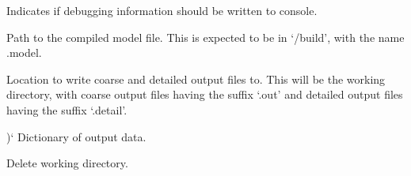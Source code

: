 \documentclass[letterpaper,10pt,english]{sphinxmanual}
\begin{document}
\begin{fulllineitems}
\begin{fulllineitems}
\label{\detokenize{bcmdModel:bayescmd.bcmdModel.bcmd_model.ModelBCMD.debug}}
 \textendash{} Indicates if debugging information should be written to console.

\end{fulllineitems}


\begin{fulllineitems}
\label{\detokenize{bcmdModel:bayescmd.bcmdModel.bcmd_model.ModelBCMD.program}}
 \textendash{} Path to the compiled model file. This is expected to be in
‘{\hyperref[\detokenize{bcmdModel:bayescmd.bcmdModel.bcmd_model.ModelBCMD.basedir}]{}}/build’, with the name {\hyperref[\detokenize{bcmdModel:bayescmd.bcmdModel.bcmd_model.ModelBCMD.model_name}]{}}.model.

\end{fulllineitems}



\begin{fulllineitems}
 \textendash{} Location to write coarse and detailed output files to. This will be
the working directory, with coarse output files having the suffix
‘.out’ and detailed output files having the suffix ‘.detail’.

\end{fulllineitems}


\begin{fulllineitems}
\label{\detokenize{bcmdModel:bayescmd.bcmdModel.bcmd_model.ModelBCMD.output_dict}}
){}` \textendash{} Dictionary of output data.

\end{fulllineitems}


\begin{fulllineitems}
\label{\detokenize{bcmdModel:bayescmd.bcmdModel.ModelBCMD._cleanupTemp}}
Delete working directory.


\end{fulllineitems}
\end{fulllineitems}
\end{document}
